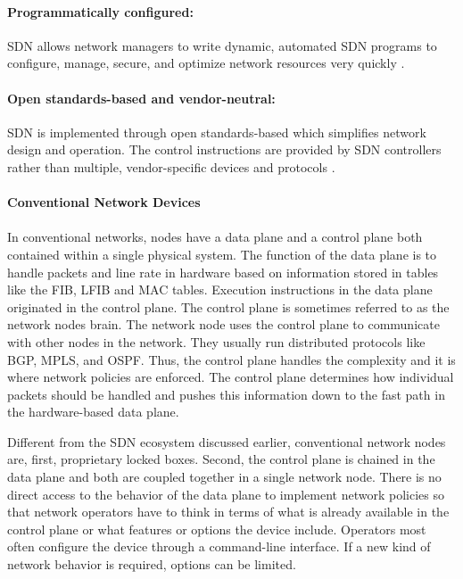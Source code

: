\paragraph{Programmatically configured:}
SDN allows network managers to write dynamic, automated SDN programs to configure, manage, secure, and optimize network resources very quickly \cite{sdn-def}.

\paragraph{Open standards-based and vendor-neutral:} SDN is implemented through open standards-based which simplifies network design and operation. The control instructions are provided by SDN controllers rather than multiple, vendor-specific devices and protocols \cite{sdn-def}.

\paragraph{Conventional Network Devices}
\paragraph{}
In conventional networks, nodes have a data plane and a control plane both contained within a single physical system. The function of the data plane is to handle packets and line rate in hardware based on information stored in tables like the FIB, LFIB and MAC tables. Execution instructions in the data plane originated in the control plane. The control plane is sometimes referred to as the network nodes brain. The network node uses the control plane to communicate with other nodes in the network. They usually run distributed protocols like BGP, MPLS, and OSPF. Thus, the control plane handles the complexity and it is where network policies are enforced. The control plane determines how individual packets should be handled and pushes this information down to the fast path in the hardware-based data plane. 

Different from the SDN ecosystem discussed earlier, conventional network nodes are, first, proprietary locked boxes. Second, the control plane is chained in the data plane and both are coupled together in a single network node. There is no direct access to the behavior of the data plane to implement network policies so that network operators have to think in terms of what is already available in the control plane or what features or options the device include. Operators most often configure the device through a command-line interface. If a new kind of network behavior is required, options can be limited. 

